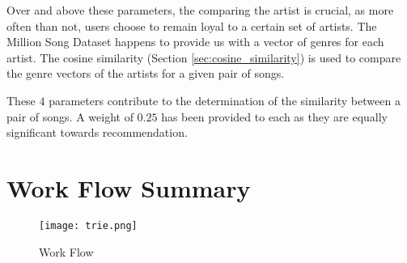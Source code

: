 			Over and above these parameters, the comparing the artist is crucial, as more often than not, users choose to remain loyal to a certain set of artists. The Million Song Dataset happens to provide us with a vector of genres for each artist. The cosine similarity (Section \ref{sec:cosine_similarity}) is used to compare the genre vectors of the artists for a given pair of songs.
			
			These \(4\) parameters contribute to the determination of the similarity between a pair of songs. A weight of \(0.25\) has been provided to each as they are equally significant towards recommendation.

	\section{Work Flow Summary}
		\begin{figure}[h!]
			\centering
			\texttt{[image: trie.png]}
			\caption{Work Flow}
		\end{figure}
			